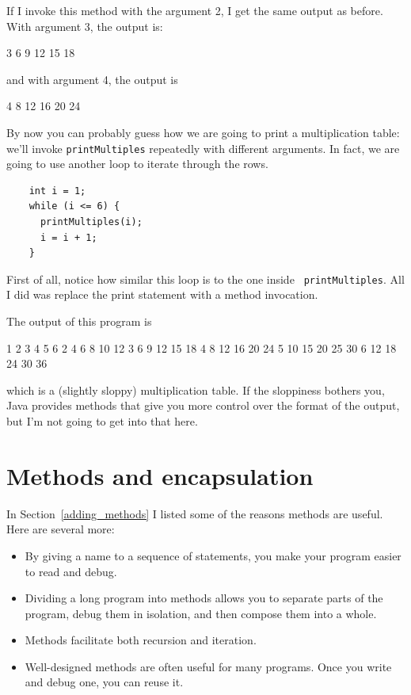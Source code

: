 If I invoke this method with the argument 2, I get the same
output as before.  With argument 3, the output is:

\begin{stdout}
3   6   9   12   15   18
\end{stdout}
%
and with argument 4, the output is

\begin{stdout}
4   8   12   16   20   24
\end{stdout}
%
By now you can probably guess how we are going to print a
multiplication table: we'll invoke {\tt printMultiples} repeatedly with
different arguments.  In fact, we are going to use another loop to
iterate through the rows.

\begin{lstlisting}
    int i = 1;
    while (i <= 6) {
      printMultiples(i);
      i = i + 1;
    }
\end{lstlisting}
%
First of all, notice how similar this loop is to the one inside {\tt
printMultiples}.  All I did was replace the print statement with a
method invocation.

The output of this program is

\begin{stdout}
1   2   3   4   5   6
2   4   6   8   10   12
3   6   9   12   15   18
4   8   12   16   20   24
5   10   15   20   25   30
6   12   18   24   30   36
\end{stdout}
%
which is a (slightly sloppy) multiplication table.  If the
sloppiness bothers you, Java provides methods that give you
more control over the format of the output, but I'm not
going to get into that here.


\section{Methods and encapsulation}
\label{methods}

In Section~\ref{adding_methods} I listed some of the
reasons methods are useful.  Here are several more:

\begin{itemize}

\item By giving a name to a sequence of statements, you make
your program easier to read and debug.

\item Dividing a long program into methods allows you to
separate parts of the program, debug them in isolation, and
then compose them into a whole.

\item Methods facilitate both recursion and iteration.

\item Well-designed methods are often useful for many programs.
Once you write and debug one, you can reuse it.

\end{itemize}

